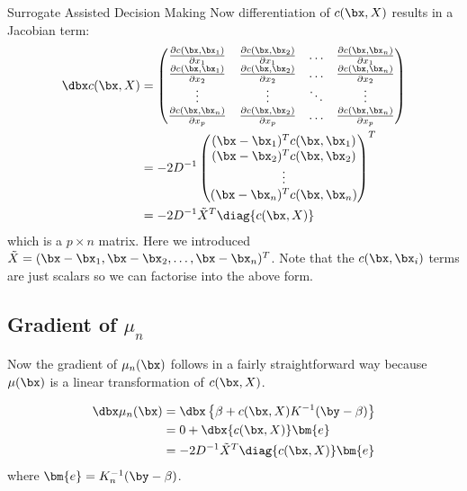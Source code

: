 \begin{chapter}{Surrogate Assisted Decision Making \label{Chap:optimisation}}
 Now differentiation of $c(\bx, X)$ results in a Jacobian term:
 \begin{align}
 	\dbx c(\bx, X) &= \begin{pmatrix}
 		\frac{\partial c(\bx, \bx_1)}{\partial x_1} & \frac{\partial c(\bx, \bx_2)}{\partial x_1} & \ldots & \frac{\partial c(\bx, \bx_n)}{\partial x_1} \\
    \frac{\partial c(\bx, \bx_1)}{\partial x_2} & \frac{\partial c(\bx, \bx_2)}{\partial x_2} & \ldots & \frac{\partial c(\bx, \bx_n)}{\partial x_2} \\
 		\vdots & \vdots & \ddots & \vdots\\
 		\frac{\partial c(\bx, \bx_n)}{\partial x_p} & \frac{\partial c(\bx, \bx_2)}{\partial x_p} & \ldots & \frac{\partial c(\bx, \bx_n)}{\partial x_p} \\
 \end{pmatrix}\nonumber\\
 &=-2D^{-1}\begin{pmatrix}
 	(\bx - \bx_1)^T c(\bx, \bx_1)\\
 	(\bx - \bx_2)^T c(\bx, \bx_2)\\
 	\vdots\\
 	(\bx - \bx_n)^T c(\bx, \bx_n)\\
 \end{pmatrix}^T\nonumber\\
   &=-2D^{-1} \tilde{X}^T \diag \{ c(\bx, X) \}
 \end{align}
which is a $p \times n$ matrix. Here we introduced $\tilde{X} = (\bx- \bx_1, \bx-\bx_2, \ldots, \bx-\bx_n)^T$. Note that the $c(\bx, \bx_i)$ terms are just scalars so we can factorise into the above form.

\subsection{Gradient of $\mu_n$}

Now the gradient of $\mu_n(\bx)$ follows in a fairly straightforward way because $\mu(\bx)$ is a linear transformation of $c(\bx, X)$.

\begin{align}
	\dbx \mu_n(\bx) &= \dbx \left\{  \beta + c(\bx, X)K^{-1}(\by - \beta) \right\}\nonumber \\
	& = 0 + \dbx \{ c(\bx, X) \} \bm{e} \nonumber\\
	&= -2D^{-1} \tilde{X}^T \diag \{ c(\bx, X) \}
	\bm{e}
\end{align}
where $\bm{e}=K_n^{-1}(\by - \beta)$.


\end{chapter}
